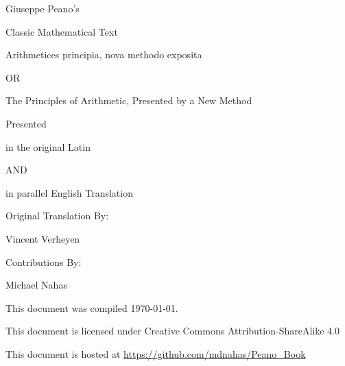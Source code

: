 \documentclass{book}
\begin{document}
 




%
{ \centering

  \vspace*{1cm}
  
  {\Large Giuseppe Peano's}

  {\normalsize Classic Mathematical Text}

  \vspace{1cm}

  {\Huge Arithmetices principia, nova methodo exposita}

  \vspace{0.5cm}

  {\Large OR}

  \vspace{0.5cm}

  {\Huge The Principles of Arithmetic, Presented by a New Method}

  \vspace{1cm}

  Presented

  {\Large in the original Latin}

  AND

  {\Large in parallel English Translation}

  \vspace{1cm}

  Original Translation By:

  {\Large Vincent Verheyen}

  \vspace{1cm}

  Contributions By:

  Michael Nahas

  \vfill

  
  \normalsize This document was compiled \today.

  \normalsize This document is licensed under Creative Commons Attribution-ShareAlike 4.0

  \normalsize This document is hosted at \url{https://github.com/mdnahas/Peano_Book}

} %
\newpage  
\end{document}
